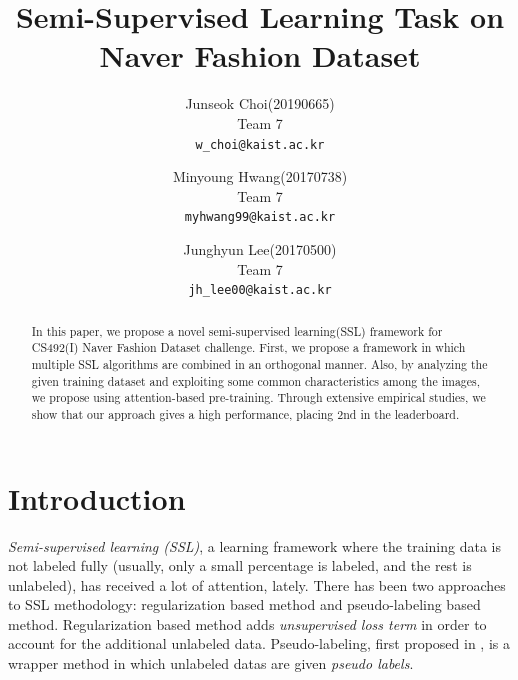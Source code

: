\documentclass[10pt,twocolumn,letterpaper]{article}
\begin{document}
	
	\title{Semi-Supervised Learning Task on Naver Fashion Dataset}
	
	\author{Junseok Choi(20190665)\\
		Team 7\\
		{\tt\small w\_choi@kaist.ac.kr}
		\and
		Minyoung Hwang(20170738)\\
		Team 7\\
		{\tt\small myhwang99@kaist.ac.kr}
		\and
		Junghyun Lee(20170500)\\
		Team 7\\
		{\tt\small jh\_lee00@kaist.ac.kr}
	}
	
	\maketitle
	
	\begin{abstract}
		In this paper, we propose a novel semi-supervised learning(SSL) framework for CS492(I) Naver Fashion Dataset challenge. First, we propose a framework in which multiple SSL algorithms are combined in an orthogonal manner.
		Also, by analyzing the given training dataset and exploiting some common characteristics among the images, we propose using attention-based pre-training.
		Through extensive empirical studies, we show that our approach gives a high performance, placing $2$nd in the leaderboard.
	\end{abstract}
	
	\section{Introduction}
	{\it Semi-supervised learning (SSL)}, a learning framework where the training data is not labeled fully (usually, only a small percentage is labeled, and the rest is unlabeled), has received a lot of attention, lately.
	There has been two approaches to SSL methodology: regularization based method and pseudo-labeling based method.
	Regularization based method adds {\it unsupervised loss term} in order to account for the additional unlabeled data.
	Pseudo-labeling, first proposed in \cite{Lee13}, is a wrapper method in which unlabeled datas are given {\it pseudo labels}.
	
\end{document}
